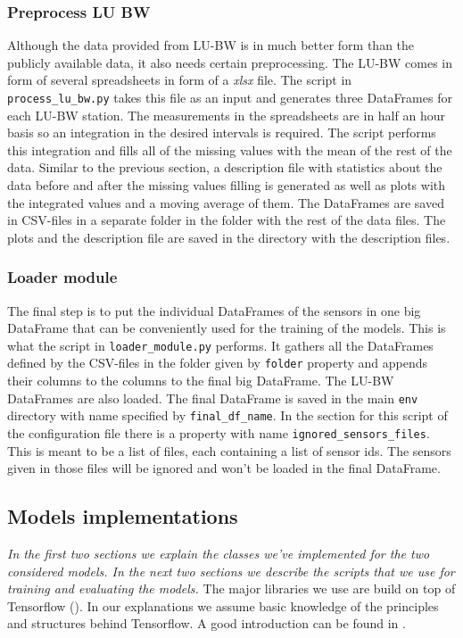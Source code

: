 \documentclass[12pt,a4paper,twoside]{scrartcl}
\numberwithin{equation}{section}
\begin{document}
\subsubsection{Preprocess LU BW}\label{sec:preproc-lu-bw-module}
Although the data provided from LU-BW is in much better form than the publicly available data, it also needs certain preprocessing. The LU-BW comes in form of several spreadsheets in form of a  \emph{xlsx} file. The script in \texttt{process\_lu\_bw.py} takes this file as an input and generates three DataFrames for each LU-BW station. The measurements in the spreadsheets are in half an hour basis so an integration in the desired intervals is required. The script performs this integration and fills all of the missing values with the mean of the rest of the data. Similar to the previous section, a description file with statistics about the data before and after the missing values filling is generated as well as plots with the integrated values and a moving average of them. The DataFrames are saved in CSV-files in a separate folder in the folder with the rest of the data files. The plots and the description file are saved in the directory with the description files.
\subsubsection{Loader module}\label{sec:load-module}
The final step is to put the individual DataFrames of the sensors in one big DataFrame that can be conveniently used for the training of the models. This is what the script in \texttt{loader\_module.py} performs. It gathers all the DataFrames defined by the CSV-files in the folder given by \texttt{folder} property and appends their columns to the columns to the final big DataFrame. The LU-BW DataFrames are also loaded. The final DataFrame is saved in the main \texttt{env} directory with name specified by \texttt{final\_df\_name}. In the section for this script of the configuration file there is a property with name \texttt{ignored\_sensors\_files}. This is meant to be a list of files, each containing a list of sensor ids. The sensors given in those files will be ignored and won't be loaded in the final DataFrame.
\subsection{Models implementations}\label{sec:impl-model}
\noindent\emph{In the first two sections we explain the classes we've implemented for the two considered models. In the next two sections we describe the scripts that we use for training and evaluating the models.}
The major libraries we use are build on top of Tensorflow (\cite{tf}). In our explanations we assume basic knowledge of the principles and structures behind Tensorflow. A good introduction can be found in \cite{tfnintro}.
\end{document}
